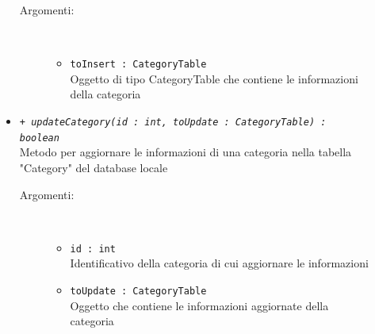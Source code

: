 \documentclass[../DefinizioneDiProdotto.tex]{subfiles}
\begin{document}
\begin{description}
\begin{itemize}
\begin{description}
			\item[Argomenti:] \
			\begin{itemize}
				\item \texttt{toInsert : CategoryTable}\\
				Oggetto di tipo CategoryTable che contiene le informazioni della categoria\end{itemize}
		\end{description}
		\item \texttt{+ \textit{updateCategory(id : int, toUpdate : CategoryTable) : boolean}}\\
		Metodo per aggiornare le informazioni di una categoria nella tabella "Category" del database locale
		\begin{description}
			\item[Argomenti:] \
			\begin{itemize}
				\item \texttt{id : int}\\
				Identificativo della categoria di cui aggiornare le informazioni\item \texttt{toUpdate : CategoryTable}\\
				Oggetto che contiene le informazioni aggiornate della categoria\end{itemize}
		\end{description}
	\end{itemize}
\end{description}
\end{document}
